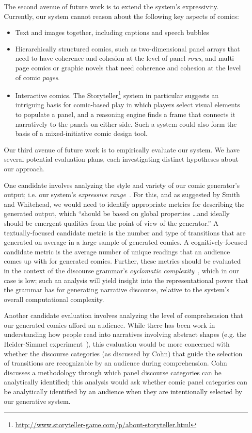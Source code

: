 The second avenue of future work is to extend the system's expressivity.
Currently, our system cannot reason about the following key aspects of
comics:
\begin{itemize}
\item Text and images together, including captions and speech bubbles
\item Hierarchically structured comics, such as two-dimensional panel
arrays that need to have coherence and cohesion at the level of panel {\em
rows}, and multi-page comics or graphic novels that need coherence and
cohesion at the level of comic {\em pages}.
\item Interactive comics. The
Storyteller\footnote{\url{http://www.storyteller-game.com/p/about-storyteller.html}}
system in particular suggests an intriguing basis for comic-based play in
which players select visual elements to populate a panel, and a reasoning
engine finds a frame that connects it narratively to the panels on either side.
Such a system could also form the basis of a mixed-initiative comic design
tool.
\end{itemize}

Our third avenue of future work is to empirically evaluate our system.  We
have several potential evaluation plans, each investigating distinct
hypotheses about our approach.

One candidate involves analyzing the style and variety of our
comic generator's output; i.e. our system's 
\emph{expressive range}~\cite{smith2010analyzing}. For this, and as
suggested by Smith and Whitehead, we would need to identify
appropriate metrics for describing the generated output, which ``should be
based on global properties \ldots and ideally should be emergent qualities
from the point of view of the generator.'' A textually-focused candidate 
metric is the number and type of transitions that are generated on average
in a large sample of generated comics. A cognitively-focused candidate
metric is the average number of unique readings that an audience comes up
with for generated comics. Further, these metrics should be evaluated in
the context of the discourse grammar's \emph{cyclomatic
complexity}~\cite{mccabe1976complexity}, which in our case is low; such an
analysis will yield insight into the representational power that the
grammar has for generating narrative discourse, relative to the system's
overall computational complexity.

Another candidate evaluation involves analyzing the level of comprehension
that our generated comics afford an audience. While there has been work in
understanding how people read into narratives involving abstract
shapes (e.g. the Heider-Simmel experiment~\cite{heider1944experimental}),
this evaluation would be more concerned with whether the discourse
categories (as discussed by Cohn) that guide the selection of transitions
are recognizable by an audience during comprehension.
Cohn~\cite{cohn2015narrative} discusses a methodology through which panel
discourse categories can be analytically identified; this analysis would
ask whether comic panel categories can be analytically identified by an
audience when they are intentionally selected by our generative system.




